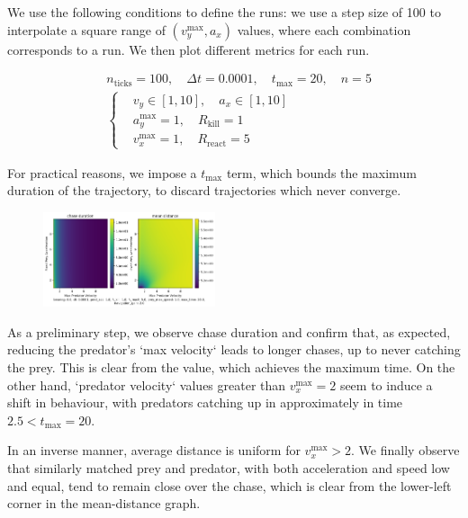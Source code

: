 \documentclass[10pt, twocolumn]{article}
\begin{document}
        We use the following conditions to define the runs: we use a step size of 100 to interpolate a square range of $(v^\text{max}_y, a_x)$ values, where each combination corresponds to a run. We then plot different metrics for each run.

        \[
          \begin{aligned}
            &n_{\text{ticks}} = 100, \quad \Delta t = 0.0001,\quad t_{\text{max}} = 20,\quad n = 5 \\
            &\left\{
              \begin{aligned}
                &v_y \in [1, 10],\quad a_x \in [1, 10] \\
                &a^{\text{max}}_y = 1,\quad R_{\text{kill}} = 1 \\
                &v^{\text{max}}_x = 1,\quad R_{\text{react}} = 5
              \end{aligned}
              \right.
            \end{aligned}
          \]

          For practical reasons, we impose a $t_{\text{max}}$ term, which bounds the maximum duration of the trajectory, to discard trajectories which never converge.

          \begin{figure}[H]
            \centering
            \includegraphics[width=0.45\textwidth]{figures/phase_duration_distance.png}
            \label{fig:phaseplot1}
          \end{figure}

          As a preliminary step, we observe chase duration and confirm that, as expected, reducing the predator's `max velocity` leads to longer chases, up to never catching the prey. This is clear from the value, which achieves the maximum time. On the other hand, `predator velocity` values greater than $v_x^{\text{max}}=2$ seem to induce a shift in behaviour, with predators catching up in approximately in time $2.5 < t_{\text{max}} = 20$.

          In an inverse manner, average distance is uniform for $v_x^{\text{max}}>2$. We finally observe that similarly matched prey and predator, with both acceleration and speed low and equal, tend to remain close over the chase, which is clear from the lower-left corner in the mean-distance graph.
\end{document}
